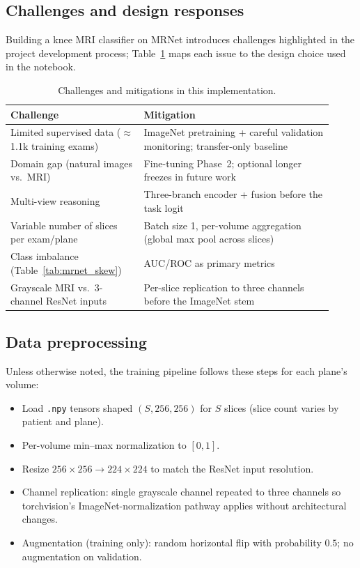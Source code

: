 \documentclass[10pt,twocolumn]{article}
\begin{document}
\subsection{Challenges and design responses}

Building a knee MRI classifier on MRNet introduces challenges highlighted in the project development process; Table~\ref{tab:challenges} maps each issue to the design choice used in the notebook.

\begin{table}[H]
\centering
\caption{Challenges and mitigations in this implementation.}
\label{tab:challenges}
\small
\begin{tabular}{p{0.38\linewidth}p{0.54\linewidth}}
\toprule
Challenge & Mitigation \\
\midrule
Limited supervised data ($\approx$1.1k training exams) &
ImageNet pretraining + careful validation monitoring; transfer-only baseline \\
\midrule
Domain gap (natural images vs.\ MRI) &
Fine-tuning Phase~2; optional longer freezes in future work \\
\midrule
Multi-view reasoning &
Three-branch encoder + fusion before the task logit \\
\midrule
Variable number of slices per exam/plane &
Batch size 1, per-volume aggregation (global max pool across slices) \\
\midrule
Class imbalance (Table~\ref{tab:mrnet_skew}) &
AUC/ROC as primary metrics \\
\midrule
Grayscale MRI vs.\ 3-channel ResNet inputs &
Per-slice replication to three channels before the ImageNet stem \\
\bottomrule
\end{tabular}
\end{table}

\subsection{Data preprocessing}

Unless otherwise noted, the training pipeline follows these steps for each plane's volume:
\begin{itemize}[noitemsep,topsep=0pt]
    \item Load \texttt{.npy} tensors shaped $(S, 256, 256)$ for $S$ slices (slice count varies by patient and plane).
    \item Per-volume min--max normalization to $[0, 1]$.
    \item Resize $256\times 256 \rightarrow 224\times 224$ to match the ResNet input resolution.
    \item Channel replication: single grayscale channel repeated to three channels so torchvision's ImageNet-normalization pathway applies without architectural changes.
    \item Augmentation (training only): random horizontal flip with probability $0.5$; no augmentation on validation.
\end{itemize}
\end{document}
